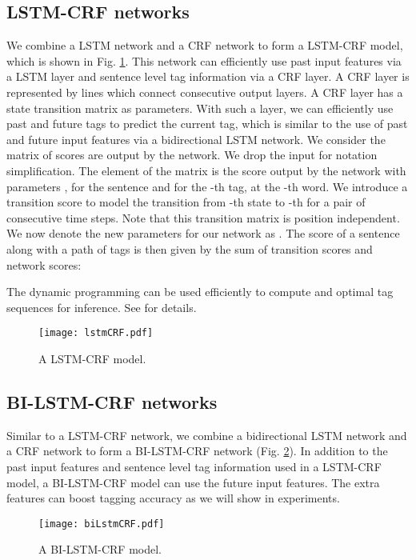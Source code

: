 \documentclass[11pt,a4paper]{article}
\begin{document}
\subsection{LSTM-CRF networks}
We combine a LSTM network and a CRF network to form a LSTM-CRF model, which is shown in Fig. \ref{fig:lstmCRF}. This network can efficiently use past input features via a LSTM layer and sentence level tag information via a CRF layer. A CRF layer is represented by lines which connect consecutive output layers. A CRF layer has a state transition matrix as parameters. With such a layer, we can efficiently use past and future tags to predict the current tag, which is similar to the use of past and future input features via a bidirectional LSTM network.  We consider the matrix of scores  are output by the network. We drop the input  for notation simplification. The element  of the matrix is the score output by the network with parameters , for the sentence  and for the -th tag, at the -th word. We introduce a transition score  to model the transition from -th state to -th for a pair of consecutive time steps. Note that this transition matrix is position independent.  We now denote the new parameters for our network as . The score of a sentence  along with a path of tags  is then given by the sum of transition scores and network scores:

The dynamic programming \cite{rabiner1} can be used efficiently to compute  and optimal tag sequences for inference. See \cite{lafferty1} for details.
\begin{figure}[!htb]
	\centering
		\texttt{[image: lstmCRF.pdf]}
	\caption{A LSTM-CRF model.}
	\label{fig:lstmCRF}
\end{figure} 

\subsection{BI-LSTM-CRF networks}
Similar to a LSTM-CRF network, we combine a bidirectional LSTM network and a CRF network to form a BI-LSTM-CRF network (Fig. \ref{fig:biLstmCRF}). In addition to the past input features and sentence level tag information used in a LSTM-CRF model, a BI-LSTM-CRF model can use the future input features. The extra features can boost tagging accuracy as we will show in experiments.
\begin{figure}[!htb]
	\centering
		\texttt{[image: biLstmCRF.pdf]}
	\caption{A BI-LSTM-CRF model.}
	\label{fig:biLstmCRF}
\end{figure} 
\end{document}
